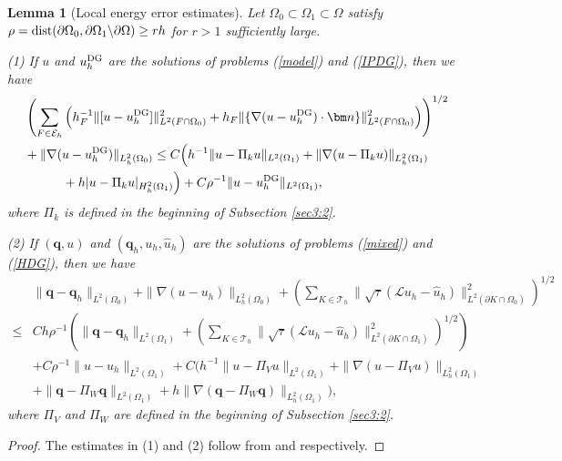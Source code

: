 \documentclass[1996/10/24]{amsart}
\newtheorem{lemma}[theorem]{Lemma}
\theoremstyle{definition}
\numberwithin{equation}{section}
\begin{document}
\begin{lemma}[Local energy error estimates]\label{lee}
Let $\Omega_0\subset\Omega_1\subset\Omega$ satisfy $\rho={\rm dist}(\partial\Omega_0,\partial\Omega_1\backslash\partial\Omega)\geq rh$ for $r>1$ sufficiently large.

(1) If $u$ and $u_h^{{\rm DG}}$ are the solutions of problems (\ref{model}) and (\ref{IPDG}), then we have
\begin{align}
&\left(\sum_{F\in\mathcal{E}_h}\left(h_F^{-1}\|[u-u_h^{{\rm DG}}]\|^2_{L^2(F\cap\Omega_0)}+h_F\|\{\nabla(u-u_h^{{\rm DG}})\cdot{\bm n}\}\|^2_{L^2(F\cap\Omega_0)}\right)\right)^{1/2}\nonumber\\
&+\|\nabla(u-u_h^{{\rm DG}})\|_{L_h^2(\Omega_0)}\leq C\Big(h^{-1}\|u-\Pi_ku\|_{L^2(\Omega_1)}+\|\nabla(u-\Pi_ku)\|_{L_h^2(\Omega_1)}\\
&\quad\quad\quad+h|u-\Pi_ku|_{H_h^2(\Omega_1)}\Big)+C\rho^{-1}\|u-u_h^{{\rm DG}}\|_{L^2(\Omega_1)},\nonumber
\end{align}
where $\Pi_k$ is defined in the beginning of Subsection \ref{sec3:2}.

(2) If $({\bm q},u)$ and $({\bm q}_h,u_h,\widehat{u}_h)$ are the solutions of problems (\ref{mixed}) and (\ref{HDG}), then we have
\begin{align}
&\|{\bm q}-{\bm q}_h\|_{L^2(\Omega_0)}+\|\nabla(u-u_h)\|_{L_h^2(\Omega_0)}+\left(\sum_{K\in\mathcal{T}_h}\|\sqrt{\tau}(\mathcal{L}u_h-\widehat{u}_h)\|^2_{L^2(\partial K\cap\Omega_0)}\right)^{1/2}\nonumber\\
\leq& Ch\rho^{-1}\left(\|{\bm q}-{\bm q}_h\|_{L^2(\Omega_1)}+\left(\sum_{K\in\mathcal{T}_h}\|\sqrt{\tau}(\mathcal{L}u_h-\widehat{u}_h)\|^2_{L^2(\partial K\cap\Omega_1)}\right)^{1/2}\right)\\
&+C\rho^{-1}\|u-u_h\|_{L^2(\Omega_1)}+C\Big(h^{-1}\|u-\Pi_Vu\|_{L^2(\Omega_1)}+\|\nabla(u-\Pi_Vu)\|_{L_h^2(\Omega_1)}\nonumber\\
&+\|{\bm q}-\Pi_W{\bm q}\|_{L^2(\Omega_1)}+h\|\nabla({\bm q}-\Pi_W{\bm q})\|_{L_h^2(\Omega_1)}\Big),\nonumber
\end{align}
where $\Pi_V$ and $\Pi_W$ are defined in the beginning of Subsection \ref{sec3:2}.
\end{lemma}
\begin{proof}
The estimates in (1) and (2) follow from \cite[Lemma 4.1]{cc2005} and \cite[Lemma 3.4]{clq2026} respectively.
\end{proof}
\end{document}
